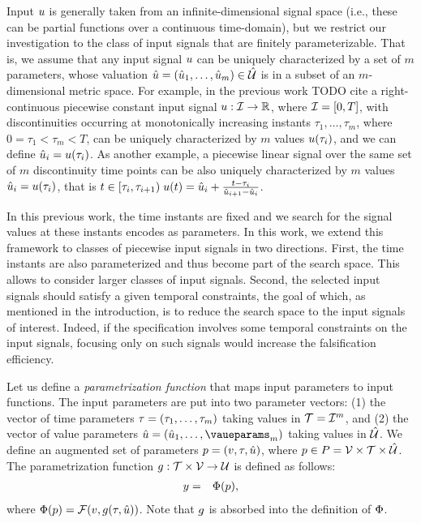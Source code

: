 Input $u$ is generally taken from an infinite-dimensional signal space (i.e., these can be partial functions over a continuous time-domain), but we restrict our investigation to the class of  input signals that are finitely parameterizable. That is, we assume that any input signal $u$ 
can be uniquely characterized by a set of $m$ parameters, whose valuation $\hat{u} =(\hat{u}_1,\ldots,\hat{u}_m) \in \hat{\mathcal{U}}$ is in a subset of an $m$-dimensional metric space. For example, in the previous work \cite{} {\color{red} TODO cite} a right-continuous piecewise constant input signal $u:\mathcal{I} \rightarrow \mathbb{R}$, where $\mathcal{I}=[ 0,T ]$, with discontinuities occurring at monotonically increasing instants $\tau_1,\ldots, \tau_m$, where $0=\tau_1<\tau_m<T$, can be uniquely characterized by $m$ values $u(\tau_i)$, and we can define $\hat{u}_i=u(\tau_i)$. As another example, a piecewise linear signal over the same set of $m$ discontinuity time points can be also uniquely characterized by $m$ values $\hat{u}_i = u(\tau_i)$, that is $t \in [\tau_i, \tau_{i+1}) \;  u(t) = \hat{u}_i  + \frac{t -  \tau_i}{\hat{u}_{i+1} - \hat{u}_i}$.

In this previous work, the time instants are fixed and we search for the signal values at these instants encodes as parameters. In this work, we extend this framework to classes of piecewise input signals in two directions. First, the time instants are also parameterized and thus become part of the search space. This allows to consider larger classes of input signals. Second, the selected input signals should satisfy a given temporal constraints, the goal of which, as mentioned in the introduction, is to reduce the search space to the input signals of interest. Indeed, if the specification involves some temporal constraints on the input signals, focusing only on such signals would increase the falsification efficiency. 

Let us define a {\em parametrization function} that maps input parameters to input functions. The input parameters are put into two parameter vectors: (1) the vector of time parameters $\tau = (\tau_1,\ldots, \tau_m)$ taking values in $\mathcal{T}=\mathcal{I}^m$, and (2) the vector of value parameters $\valueparams= (\inputparams_1, \ldots, \vaueparams_m)$ taking values in $\hat{\mathcal{U}}$. We define an augmented set of parameters $p = (v, \tau, \hat{u})$, where $p \in P = \mathcal{V} \times \mathcal{T}  \times \hat{\mathcal{U}}$.
The parametrization function $g: \mathcal{T} \times \mathcal{V} \rightarrow \mathcal{U}$ is defined as follows:
\begin{eqnarray} \label{eq:behaviorfunc}
y &=& \Phi(p),
\end{eqnarray}
where $\Phi(p) = \mathcal{F} (v, g(\tau, \hat{u}))$.
Note that $g$ is absorbed into the definition of $\Phi$.

